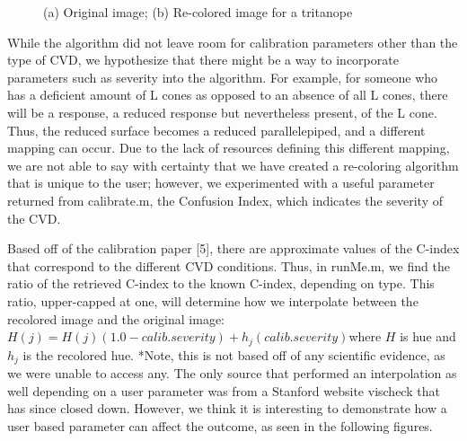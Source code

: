 \documentclass[10pt,twocolumn,letterpaper]{article}
\begin{document}
\begin{figure}[h]
\begin{subfigure}{0.22\textwidth}
    \caption{}
  \end{subfigure}
  \caption{(a) Original image; (b) Re-colored image for a tritanope}
  \label{fig:zen}
\end{figure}

While the algorithm did not leave room for calibration parameters other than the type of CVD, we hypothesize that there might be a way to incorporate parameters such as severity into the algorithm. For example, for someone who has a deficient amount of L cones as opposed to an absence of all L cones, there will be a response, a reduced response but nevertheless present, of the L cone. Thus, the reduced surface becomes a reduced parallelepiped, and a different mapping can occur. Due to the lack of resources defining this different mapping, we are not able to say with certainty that we have created a re-coloring algorithm that is unique to the user; however, we experimented with a useful parameter returned from calibrate.m, the Confusion Index, which indicates the severity of the CVD. 

Based off of the calibration paper [5], there are approximate values of the C-index that correspond to the different CVD conditions. Thus, in runMe.m, we find the ratio of the retrieved C-index to the known C-index, depending on type. This ratio, upper-capped at one, will determine how we interpolate between the recolored image and the original image: $H(j) = H(j)(1.0-calib.severity) + h_j(calib.severity)$where $H$ is hue and $h_j$ is the recolored hue. *Note, this is not based off of any scientific evidence, as we were unable to access any. The only source that performed an interpolation as well depending on a user parameter was from a Stanford website vischeck that has since closed down. However, we think it is interesting to demonstrate how a user based parameter can affect the outcome, as seen in the following figures. 
\end{document}
